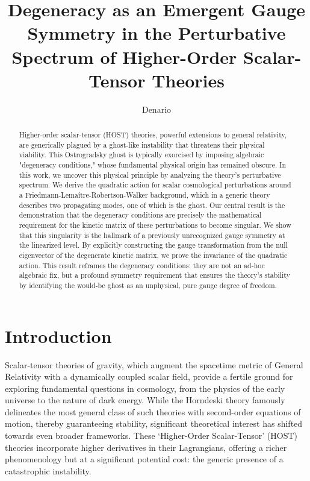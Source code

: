 \documentclass[twocolumn]{aastex631}
\begin{document}
\title{Degeneracy as an Emergent Gauge Symmetry in the Perturbative Spectrum of Higher-Order Scalar-Tensor Theories}

\author{Denario}

\begin{abstract}
Higher-order scalar-tensor (HOST) theories, powerful extensions to general relativity, are generically plagued by a ghost-like instability that threatens their physical viability. This Ostrogradsky ghost is typically exorcised by imposing algebraic "degeneracy conditions," whose fundamental physical origin has remained obscure. In this work, we uncover this physical principle by analyzing the theory's perturbative spectrum. We derive the quadratic action for scalar cosmological perturbations around a Friedmann-Lemaître-Robertson-Walker background, which in a generic theory describes two propagating modes, one of which is the ghost. Our central result is the demonstration that the degeneracy conditions are precisely the mathematical requirement for the kinetic matrix of these perturbations to become singular. We show that this singularity is the hallmark of a previously unrecognized gauge symmetry at the linearized level. By explicitly constructing the gauge transformation from the null eigenvector of the degenerate kinetic matrix, we prove the invariance of the quadratic action. This result reframes the degeneracy conditions: they are not an ad-hoc algebraic fix, but a profound symmetry requirement that ensures the theory's stability by identifying the would-be ghost as an unphysical, pure gauge degree of freedom.
\end{abstract}



\section{Introduction}
\label{sec:intro}

Scalar-tensor theories of gravity, which augment the spacetime metric of General Relativity with a dynamically coupled scalar field, provide a fertile ground for exploring fundamental questions in cosmology, from the physics of the early universe to the nature of dark energy. While the Horndeski theory famously delineates the most general class of such theories with second-order equations of motion, thereby guaranteeing stability, significant theoretical interest has shifted towards even broader frameworks. These `Higher-Order Scalar-Tensor' (HOST) theories incorporate higher derivatives in their Lagrangians, offering a richer phenomenology but at a significant potential cost: the generic presence of a catastrophic instability.
\end{document}
